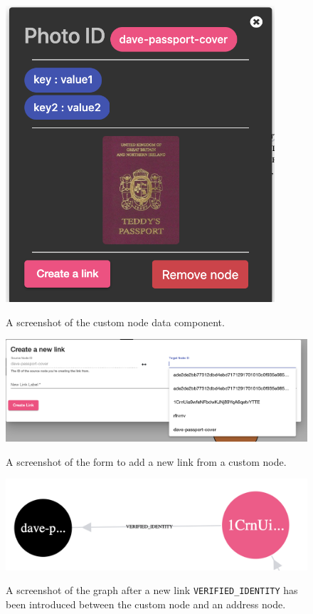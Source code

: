 \begin{figure}[h!]
  \centering
  \includegraphics[width = 10cm]{./figures/ui-screenshots/custom-node-data}\\[0.5cm] 
  \caption{A screenshot of the custom node data component.}
  \label{fig:custom-node-data}
\end{figure}


\begin{figure}[h!]
  \centering
  \includegraphics[width = 15cm]{./figures/ui-screenshots/add-link-form}\\[0.5cm] 
  \caption{A screenshot of the form to add a new link from a custom node.}
  \label{fig:add-link-form}
\end{figure}

\begin{figure}[h!]
  \centering
  \includegraphics[width = 15cm]{./figures/ui-screenshots/custom-link-graph}\\[0.5cm] 
  \caption{A screenshot of the graph after a new link \texttt{VERIFIED\_IDENTITY} has been introduced between the custom node and an address node.}
  \label{fig:custom-link-graph}
\end{figure}

